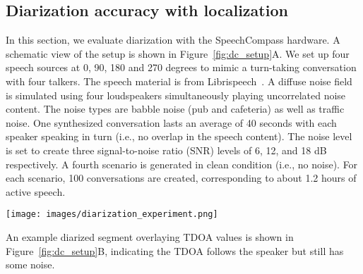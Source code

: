\subsection{Diarization accuracy with localization}
In this section, we evaluate diarization with the SpeechCompass hardware. A schematic view of the setup is shown in Figure~\ref{fig:dc_setup}A. 
We set up four speech sources at 0, 90, 180 and 270 degrees to mimic a turn-taking conversation with four talkers. The speech material is from Librispeech~\cite{panayotov2015librispeech}. A diffuse noise field is simulated using four loudspeakers simultaneously playing uncorrelated noise content. The noise types are babble noise (pub and cafeteria) as well as traffic noise. One synthesized conversation lasts an average of 40 seconds with each speaker speaking in turn (i.e., no overlap in the speech content). The noise level is set to create three signal-to-noise ratio (SNR) levels of 6, 12, and 18 dB respectively. A fourth scenario is generated in clean condition (i.e., no noise). For each scenario, 100 conversations are created, corresponding to about 1.2 hours of active speech.

\begin{figure*}
  \centering
  \texttt{[image: images/diarization\_experiment.png]}
  \caption{Diarization experiment. A) Data collection setup for diarization testing. The SpeechCompass phone case is placed on a small table in the center of the room. Head and torso simulators are used to play back speech material. Four loudspeakers are placed at the corners of the room to simulate a diffuse noise field. B) Example of TDOA data overlayed with diarization from two speakers for a conversation snippet. The extracted speaker labels from TDOA precisely follow the conversation turns. For TDOA, a frame size of 512 (11.6 ms) with no overlap at 44.1 KHz was used. Then, a running histogram of 522 ms was applied to get speaker labels.}
  \label{fig:dc_setup}  
\end{figure*}

An example diarized segment overlaying TDOA values is shown in Figure~\ref{fig:dc_setup}B, indicating the TDOA follows the speaker but still has some noise. 


